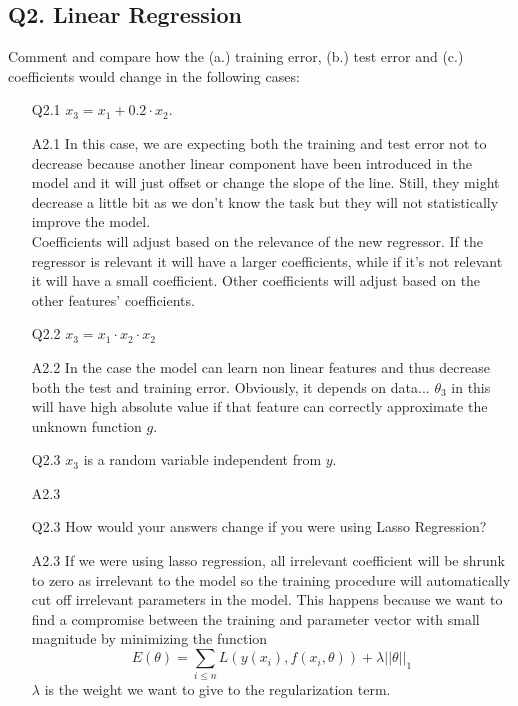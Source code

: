 \documentclass[11pt]{scrartcl}
\begin{document}
\subsection*{Q2. Linear Regression}
Comment and compare how the (a.) training error, (b.) test error and (c.) coefficients would change in the following cases:
\begin{itemize}
\item[Q2.1] $x_3 = x_1 + 0.2 \cdot x_2$.
\item[A2.1] In this case, we are expecting both the training and test error not to decrease because another linear component have been introduced in the model and it will just offset or change the slope of the line. Still, they might decrease a little bit as we don't know the task but they will not statistically improve the model. \\
Coefficients will adjust based on the relevance of the new regressor. If the regressor is relevant it will have a larger coefficients, while if it's not relevant it will have a small coefficient. Other coefficients will adjust based on the other features' coefficients.

\item[Q2.2] $x_3 = x_1 \cdot x_2 \cdot x_2$
\item[A2.2] In the case the model can learn non linear features and thus decrease both the test and training error. Obviously, it depends on data... $\theta_3$ in this will have high absolute value if that feature can correctly approximate the unknown function $g$.

\item[Q2.3] $x_3$ is a random variable independent from $y$.
\item[A2.3] ~\\

\item[Q2.3] How would your answers change if you were using Lasso Regression?
\item[A2.3] If we were using lasso regression, all irrelevant coefficient will be shrunk to zero as irrelevant to the model so the training procedure will automatically cut off irrelevant parameters in the model. This happens because we want to find a compromise between the training and parameter vector with small magnitude by minimizing the function 
$$ E(\theta) = \sum_{i \leq n} L(y(x_i), f(x_i, \theta)) + \lambda ||\theta||_1$$
$\lambda$ is the weight we want to give to the regularization term.


\end{itemize}
\end{document}
